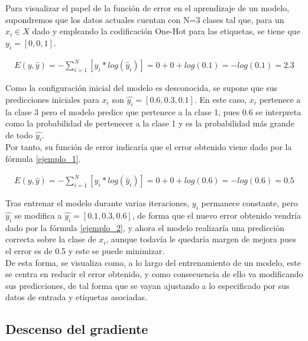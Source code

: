 Para visualizar el papel de la función de error en el aprendizaje de un modelo, supondremos que los datos actuales cuentan con N=3 clases tal que, para un $x_i \in X$ dado y empleando la codificación One-Hot para las etiquetas, se tiene que $y_i = [0, 0, 1]$. 

\begin{gather}
	E(y, \hat{y}) = - \sum_{i=1}^{N}  [y_i * log( \hat{y}_i)] = 0 + 0 + log(0.1) = -log(0.1) = 2.3
	\label{ejemplo_1}
\end{gather}

Como la configuración inicial del modelo es desconocida, se supone que sus predicciones iniciales para $x_i$ son $\hat{y_i} = [ 0.6, 0.3, 0.1]$. En este caso, $x_i$ pertenece a la clase 3 pero el modelo predice que pertenece a la clase 1, pues 0.6 se interpreta como la probabilidad de pertenecer a la clase 1 y es la probabilidad más grande de todo $\hat{y_i}$.\\
Por tanto, su función de error indicaría que el error obtenido viene dado por la fórmula \ref{ejemplo_1}.

\begin{gather}
	E(y, \hat{y}) = - \sum_{i=1}^{N}  [y_i * log( \hat{y}_i)] = 0 + 0 + log(0.6) = -log(0.6) = 0.5
	\label{ejemplo_2}
\end{gather}

Tras entrenar el modelo durante varias iteraciones, $y_i$ permanece constante, pero $\hat{y_i}$ se modifica a $\hat{y_i} = [0.1, 0.3, 0.6]$, de forma que el nuevo error obtenido vendría dado por la fórmula \ref{ejemplo_2}, y ahora el modelo realizaría una predicción correcta sobre la clase de $x_i$, aunque todavía le quedaría margen de mejora pues el error es de 0.5 y este se puede minimizar. \\
De esta forma, se visualiza como, a lo largo del entrenamiento de un modelo, este se centra en reducir el error obtenido, y como consecuencia de ello va modificando sus predicciones, de tal forma que se vayan ajustando a lo especificado por sus datos de entrada y etiquetas asociadas.



\subsection{Descenso del gradiente}

